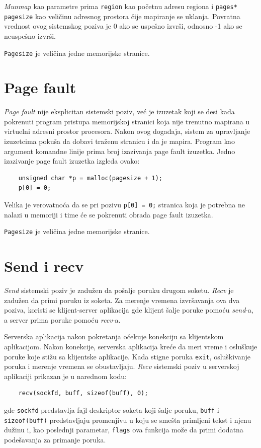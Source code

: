 \documentclass[12pt]{report}
\begin{document}
\textit{Munmap} kao parametre prima \texttt{region} kao početnu adresu regiona i \texttt{pages* pagesize} kao veličinu adresnog prostora čije mapiranje se uklanja. Povratna vrednost ovog sistemskog poziva je 0 ako se uspešno izvrši, odnosno -1 ako se neuspešno izvrši.

\texttt{Pagesize} je veličina jedne memorijske stranice.

\section{Page fault}
\textit{Page fault} nije eksplicitan sistemski poziv, već je izuzetak koji se desi kada pokrenuti program pristupa memorijskoj stranici koja nije trenutno mapirana u virtuelni adresni prostor procesora. Nakon ovog događaja, sistem za upravljanje izuzetcima pokuša da dobavi traženu stranicu i da je mapira. Program kao argument komandne linije prima broj izazivanja page fault izuzetka. Jedno izazivanje page fault izuzetka izgleda ovako:

\begin{verbatim}
    unsigned char *p = malloc(pagesize + 1);
    p[0] = 0;
\end{verbatim}

Velika je verovatnoća da se pri pozivu \texttt{p[0] = 0;} stranica koja je potrebna ne nalazi u memoriji i time će se pokrenuti obrada page fault izuzetka.

\texttt{Pagesize} je veličina jedne memorijske stranice.

\section{Send i recv}
\textit{Send} sistemski poziv je zadužen da pošalje poruku drugom soketu. \textit{Recv} je zadužen da primi poruku iz soketa. Za merenje vremena izvršavanja ova dva poziva, koristi se klijent-server aplikacija gde klijent šalje poruke pomoću \textit{send}-a, a server prima poruke pomoću \textit{recv}-a.

Serverska aplikacija nakon pokretanja očekuje konekciju sa klijentskom aplikacijom. Nakon konekcije, serverska aplikacija kreće da meri vreme i osluškuje poruke koje stižu sa klijentske aplikacije. Kada stigne poruka \texttt{exit}, osluškivanje poruka i merenje vremena se obustavljaju. \textit{Recv} sistemski poziv u serverskoj aplikaciji prikazan je u narednom kodu:

\begin{verbatim}
    recv(sockfd, buff, sizeof(buff), 0);
\end{verbatim}
gde \texttt{sockfd} predstavlja fajl deskriptor soketa koji šalje poruku, \texttt{buff} i \texttt{sizeof(buff)} predstavljaju promenjivu u koju se smešta primljeni tekst i njenu dužinu i, kao poslednji parametar, \texttt{flags} ova funkcija može da primi dodatna podešavanja za primanje poruka.
\end{document}
